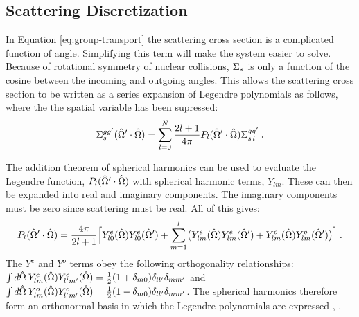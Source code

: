 \subsection{Scattering Discretization}
In Equation \eqref{eq:group-transport} the scattering cross section is a complicated function of angle. Simplifying this term will make the system easier to solve. Because of rotational symmetry of nuclear collisions, $\Sigma_{s}$ is only a function of the cosine between the incoming and outgoing angles. This allows the scattering cross section to be written as a series expansion of Legendre polynomials as follows, where the the spatial variable has been supressed:
%
\begin{equation}
  \Sigma^{gg'}_{s\,}(\hat{\Omega}' \cdot \hat{\Omega}) = \sum_{l=0}^{N} \frac{2l+1}{4\pi} P_{l}(\hat{\Omega}' \cdot \hat{\Omega})\Sigma^{gg'}_{s\,l} \:.
\end{equation}

The addition theorem of spherical harmonics can be used to evaluate the Legendre function, $P_{l}(\hat{\Omega}' \cdot \hat{\Omega})$ with spherical harmonic terms, $Y_{lm}$. These can then be expanded into real and imaginary components. The imaginary components must be zero since scattering must be real. All of this gives:
%
\begin{equation}
  P_l(\hat{\Omega}' \cdot \hat{\Omega}) = \frac{4\pi}{2l+1} \Bigl[ Y^e_{l0}(\hat{\Omega}) Y^e_{l0}(\hat{\Omega}') + \sum_{m=1}^l \bigl( Y^e_{lm}(\hat{\Omega}) Y^e_{lm}(\hat{\Omega}') + Y^o_{lm}(\hat{\Omega}) Y^o_{lm}(\hat{\Omega}') \bigr) \Bigr]\:.
\end{equation}
%
The $Y^e$ and $Y^o$ terms obey the following orthogonality relationships: $\int d\hat{\Omega} \:Y^{e}_{lm}(\hat{\Omega})Y^{e}_{l'm'}(\hat{\Omega}) = \frac{1}{2}(1 + \delta_{m0})\delta_{ll'}\delta_{mm'}$ and $\int d\hat{\Omega} \:Y^{o}_{lm}(\hat{\Omega})Y^{o}_{l'm'}(\hat{\Omega}) = \frac{1}{2}(1 - \delta_{m0})\delta_{ll'}\delta_{mm'}$. The spherical harmonics therefore form an orthonormal basis in which the Legendre polynomials are expressed \cite{Evans2009}, \cite{Lewis1993}. 

